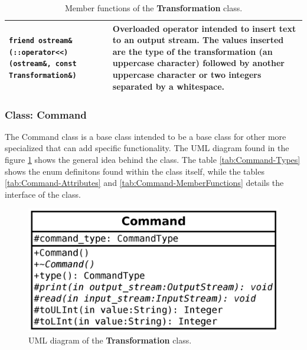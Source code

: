 \documentclass[11pt,twoside,openany,x11names,svgnames]{memoir}
\begin{document}
\begin{table}[h]
\begin{tabular}{| >{\bfseries}p{11cm} | p{4.5cm} |}
	\hline
	
	\texttt{friend ostream\& (::operator<<) (ostream\&, const Transformation\&)} & Overloaded operator intended to insert text to an output stream. The values inserted are the type of the transformation (an uppercase character) followed by another uppercase character or two integers separated by a whitespace. \\
	
	\hline
\end{tabular}
\caption{Member functions of the \textbf{Transformation} class.}
\label{tab:Transformation-MemberFunctions}
\end{table}

\clearpage

\subsubsection{Class: Command}\label{Class-Command}

The Command class is a base class intended to be a base class for other more specialized that can add specific functionality. The UML diagram found in the figure \ref{fig:class-command} shows the general idea behind the class. The table \ref{tab:Command-Types} shows the enum definitons found within the class itself, while the tables \ref{tab:Command-Attributes} and \ref{tab:Command-MemberFunctions} details the interface of the class.

\begin{figure}
	\centering
	\includegraphics[scale=0.2, clip=true, trim= 0pt 0pt 0pt 0pt]{images/chapter03-image16}
	\caption{UML diagram of the \textbf{Transformation} class.}
	\label{fig:class-command}
\end{figure}
\end{document}
